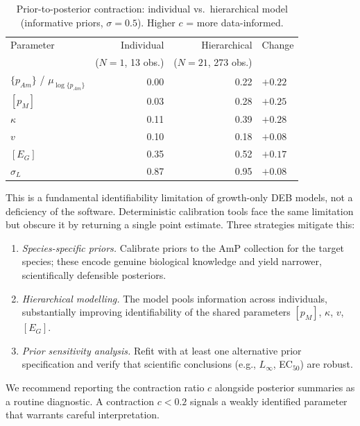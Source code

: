 \documentclass[article,shortnames]{jss}
\newcommand{\pAm}{\{p_{Am}\}}
\newcommand{\pM}{[p_M]}
\newcommand{\EG}{[E_G]}
\begin{document}
\begin{table}[t!]
\centering
\caption{Prior-to-posterior contraction: individual vs.\ hierarchical
  model (informative priors, $\sigma = 0.5$).  Higher $c$ = more
  data-informed.}
\label{tab:contraction_hier}
\begin{tabular}{lrrl}
\toprule
Parameter & Individual & Hierarchical & Change \\
          & ($N=1$, 13 obs.) & ($N=21$, 273 obs.) & \\
\midrule
$\pAm$ / $\mu_{\log \pAm}$ & 0.00 & 0.22 & $+0.22$ \\
$\pM$        & 0.03 & 0.28 & $+0.25$ \\
$\kappa$     & 0.11 & 0.39 & $+0.28$ \\
$v$          & 0.10 & 0.18 & $+0.08$ \\
$\EG$        & 0.35 & 0.52 & $+0.17$ \\
$\sigma_L$   & 0.87 & 0.95 & $+0.08$ \\
\bottomrule
\end{tabular}
\end{table}

This is a fundamental identifiability limitation of growth-only DEB
models, not a deficiency of the software.  Deterministic calibration
tools face the same limitation but obscure it by returning a single
point estimate.  Three strategies mitigate this:
\begin{enumerate}
  \item \emph{Species-specific priors.}  Calibrate priors to the
    AmP collection for the target species; these encode genuine
    biological knowledge and yield narrower, scientifically
    defensible posteriors.
  \item \emph{Hierarchical modelling.}  The 
    model pools information across individuals, substantially
    improving identifiability of the shared parameters $\pM$,
    $\kappa$, $v$, $\EG$.
  \item \emph{Prior sensitivity analysis.}  Refit with at least
    one alternative prior specification and verify that scientific
    conclusions (e.g., $L_\infty$, EC$_{50}$) are robust.
\end{enumerate}
We recommend reporting the contraction ratio $c$ alongside
posterior summaries as a routine diagnostic.  A contraction
$c < 0.2$ signals a weakly identified parameter that warrants
careful interpretation.
\end{document}
